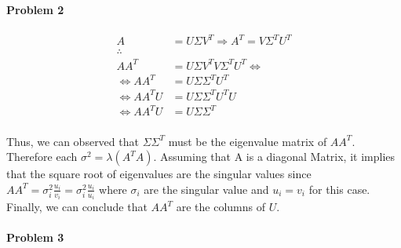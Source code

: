\documentclass[11pt]{article}
\begin{document}
\paragraph{\noindent\textbf{\LARGE{Problem 2}}}

\begin{equation*}
\begin{split}
A & =  U \Sigma V^T \Rightarrow A^T = V \Sigma^T U^T \\ \therefore{}\\
A A^T & = U \Sigma V^T V \Sigma ^T U^T \Leftrightarrow \\
\Leftrightarrow A A^T & = U \Sigma \Sigma^T U^T \\
\Leftrightarrow A A^T U & = U \Sigma \Sigma^T U^T U \\
\Leftrightarrow A A^T U & = U \Sigma \Sigma^T \\
\end{split}
\end{equation*}

\begin{flushleft}
    Thus, we can observed that $\Sigma \Sigma^T$ must be the eigenvalue matrix of $A A^T$.
    Therefore each $\sigma ^2 = \lambda(A^T A)$.\newline\newline
    Assuming that A is a diagonal Matrix, it implies that the square root of eigenvalues are the singular values since
    $A A^T = \sigma_i^2 \frac{u_i}{v_i} = \sigma_i^2 \frac{u_i}{u_i}$ where $\sigma_i$ are the singular value and $u_i = v_i$ for this case. \newline\newline
    Finally, we can conclude that $A A^T$ are the columns of $U$.
\end{flushleft}

\paragraph{\noindent\textbf{\LARGE{Problem 3}}}
\end{document}
